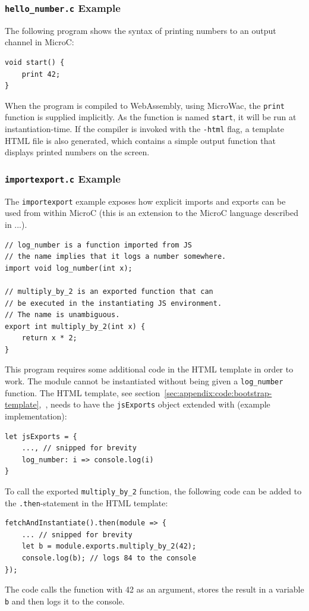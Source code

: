 \documentclass[a4paper]{article}
\begin{document}
\subsubsection{\texttt{hello\_number.c} Example}
The following program shows the syntax of printing numbers to an output channel in MicroC:
\begin{verbatim}
void start() {
	print 42;
}
\end{verbatim}

When the program is compiled to WebAssembly, using MicroWac, the \texttt{print} function is supplied implicitly. As the function is named \texttt{start}, it will be run at instantiation-time. If the compiler is invoked with the \texttt{-html} flag, a template HTML file is also generated, which contains a simple output function that displays printed numbers on the screen.

\subsubsection{\texttt{importexport.c} Example}
The \texttt{importexport} example exposes how explicit imports and exports can be used from within MicroC (this is an extension to the MicroC language described in ...).%

\begin{verbatim}
// log_number is a function imported from JS
// the name implies that it logs a number somewhere.
import void log_number(int x);

// multiply_by_2 is an exported function that can
// be executed in the instantiating JS environment.
// The name is unambiguous.
export int multiply_by_2(int x) {
	return x * 2;
}
\end{verbatim}

This program requires some additional code in the HTML template in order to work. The module cannot be instantiated without being given a \texttt{log\_number} function. The HTML template, see section~\ref{sec:appendix:code:bootstrap-template},~, needs to have the \texttt{jsExports} object extended with (example implementation):
\begin{verbatim}
let jsExports = {
	..., // snipped for brevity
	log_number: i => console.log(i)
}
\end{verbatim}

To call the exported \texttt{multiply\_by\_2} function, the following code can be added to the \texttt{.then}-statement in the HTML template:
\begin{verbatim}
fetchAndInstantiate().then(module => {
	... // snipped for brevity
	let b = module.exports.multiply_by_2(42);
	console.log(b); // logs 84 to the console
});
\end{verbatim}
The code calls the function with 42 as an argument, stores the result in a variable \texttt{b} and then logs it to the console.
\end{document}
